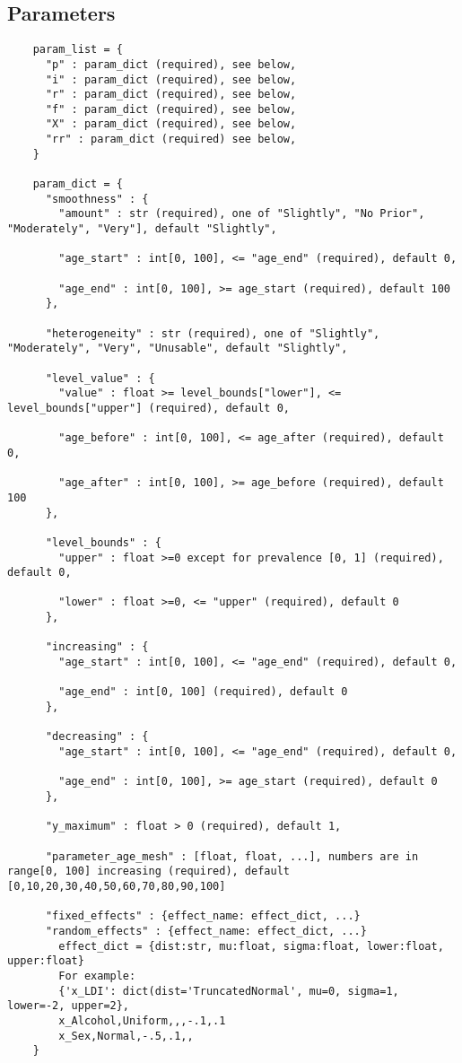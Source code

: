 \subsection{Parameters}
\begin{verbatim}
    param_list = {
      "p" : param_dict (required), see below,
      "i" : param_dict (required), see below,
      "r" : param_dict (required), see below,
      "f" : param_dict (required), see below,
      "X" : param_dict (required), see below,
      "rr" : param_dict (required) see below,
    }

    param_dict = {
      "smoothness" : {
        "amount" : str (required), one of "Slightly", "No Prior", "Moderately", "Very"], default "Slightly",

        "age_start" : int[0, 100], <= "age_end" (required), default 0,

        "age_end" : int[0, 100], >= age_start (required), default 100
      },

      "heterogeneity" : str (required), one of "Slightly", "Moderately", "Very", "Unusable", default "Slightly",

      "level_value" : {
        "value" : float >= level_bounds["lower"], <= level_bounds["upper"] (required), default 0,

        "age_before" : int[0, 100], <= age_after (required), default 0,

        "age_after" : int[0, 100], >= age_before (required), default 100
      },

      "level_bounds" : {
        "upper" : float >=0 except for prevalence [0, 1] (required), default 0,

        "lower" : float >=0, <= "upper" (required), default 0
      },

      "increasing" : {
        "age_start" : int[0, 100], <= "age_end" (required), default 0,

        "age_end" : int[0, 100] (required), default 0
      },

      "decreasing" : {
        "age_start" : int[0, 100], <= "age_end" (required), default 0,

        "age_end" : int[0, 100], >= age_start (required), default 0
      },

      "y_maximum" : float > 0 (required), default 1,

      "parameter_age_mesh" : [float, float, ...], numbers are in range[0, 100] increasing (required), default [0,10,20,30,40,50,60,70,80,90,100]

      "fixed_effects" : {effect_name: effect_dict, ...}
      "random_effects" : {effect_name: effect_dict, ...}
        effect_dict = {dist:str, mu:float, sigma:float, lower:float, upper:float}
        For example:
        {'x_LDI': dict(dist='TruncatedNormal', mu=0, sigma=1, lower=-2, upper=2},
        x_Alcohol,Uniform,,,-.1,.1
        x_Sex,Normal,-.5,.1,,
    }
\end{verbatim}

